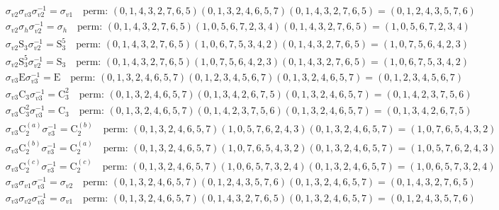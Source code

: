 \begin{align*}
& \sigma_{v2} \sigma_{v3} \sigma_{v2}^{-1} = \sigma_{v1} \quad \text{perm: }(0, 1, 4, 3, 2, 7, 6, 5)(0, 1, 3, 2, 4, 6, 5, 7)(0, 1, 4, 3, 2, 7, 6, 5) = (0, 1, 2, 4, 3, 5, 7, 6) \\
& \sigma_{v2} \sigma_{h} \sigma_{v2}^{-1} = \sigma_{h} \quad \text{perm: }(0, 1, 4, 3, 2, 7, 6, 5)(1, 0, 5, 6, 7, 2, 3, 4)(0, 1, 4, 3, 2, 7, 6, 5) = (1, 0, 5, 6, 7, 2, 3, 4) \\
& \sigma_{v2} \mathrm{S}_{3} \sigma_{v2}^{-1} = \mathrm{S}_{3}^{5} \quad \text{perm: }(0, 1, 4, 3, 2, 7, 6, 5)(1, 0, 6, 7, 5, 3, 4, 2)(0, 1, 4, 3, 2, 7, 6, 5) = (1, 0, 7, 5, 6, 4, 2, 3) \\
& \sigma_{v2} \mathrm{S}_{3}^{5} \sigma_{v2}^{-1} = \mathrm{S}_{3} \quad \text{perm: }(0, 1, 4, 3, 2, 7, 6, 5)(1, 0, 7, 5, 6, 4, 2, 3)(0, 1, 4, 3, 2, 7, 6, 5) = (1, 0, 6, 7, 5, 3, 4, 2) \\
& \sigma_{v3} \mathrm{E} \sigma_{v3}^{-1} = \mathrm{E} \quad \text{perm: }(0, 1, 3, 2, 4, 6, 5, 7)(0, 1, 2, 3, 4, 5, 6, 7)(0, 1, 3, 2, 4, 6, 5, 7) = (0, 1, 2, 3, 4, 5, 6, 7) \\
& \sigma_{v3} \mathrm{C}_{3} \sigma_{v3}^{-1} = \mathrm{C}_{3}^{2} \quad \text{perm: }(0, 1, 3, 2, 4, 6, 5, 7)(0, 1, 3, 4, 2, 6, 7, 5)(0, 1, 3, 2, 4, 6, 5, 7) = (0, 1, 4, 2, 3, 7, 5, 6) \\
& \sigma_{v3} \mathrm{C}_{3}^{2} \sigma_{v3}^{-1} = \mathrm{C}_{3} \quad \text{perm: }(0, 1, 3, 2, 4, 6, 5, 7)(0, 1, 4, 2, 3, 7, 5, 6)(0, 1, 3, 2, 4, 6, 5, 7) = (0, 1, 3, 4, 2, 6, 7, 5) \\
& \sigma_{v3} \mathrm{C}_{2}^{(a)} \sigma_{v3}^{-1} = \mathrm{C}_{2}^{(b)} \quad \text{perm: }(0, 1, 3, 2, 4, 6, 5, 7)(1, 0, 5, 7, 6, 2, 4, 3)(0, 1, 3, 2, 4, 6, 5, 7) = (1, 0, 7, 6, 5, 4, 3, 2) \\
& \sigma_{v3} \mathrm{C}_{2}^{(b)} \sigma_{v3}^{-1} = \mathrm{C}_{2}^{(a)} \quad \text{perm: }(0, 1, 3, 2, 4, 6, 5, 7)(1, 0, 7, 6, 5, 4, 3, 2)(0, 1, 3, 2, 4, 6, 5, 7) = (1, 0, 5, 7, 6, 2, 4, 3) \\
& \sigma_{v3} \mathrm{C}_{2}^{(c)} \sigma_{v3}^{-1} = \mathrm{C}_{2}^{(c)} \quad \text{perm: }(0, 1, 3, 2, 4, 6, 5, 7)(1, 0, 6, 5, 7, 3, 2, 4)(0, 1, 3, 2, 4, 6, 5, 7) = (1, 0, 6, 5, 7, 3, 2, 4) \\
& \sigma_{v3} \sigma_{v1} \sigma_{v3}^{-1} = \sigma_{v2} \quad \text{perm: }(0, 1, 3, 2, 4, 6, 5, 7)(0, 1, 2, 4, 3, 5, 7, 6)(0, 1, 3, 2, 4, 6, 5, 7) = (0, 1, 4, 3, 2, 7, 6, 5) \\
& \sigma_{v3} \sigma_{v2} \sigma_{v3}^{-1} = \sigma_{v1} \quad \text{perm: }(0, 1, 3, 2, 4, 6, 5, 7)(0, 1, 4, 3, 2, 7, 6, 5)(0, 1, 3, 2, 4, 6, 5, 7) = (0, 1, 2, 4, 3, 5, 7, 6) \\

\end{align*}
